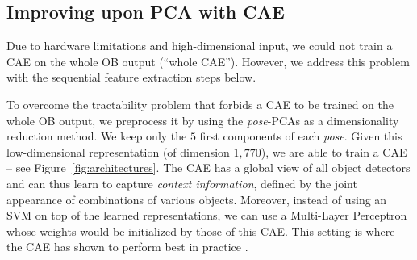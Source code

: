 \documentclass[runningheads,a4paper]{llncs}
\begin{document}
\subsection{Improving upon PCA with CAE}








Due to hardware limitations and high-dimensional input, we could not train a
CAE on the whole OB output (``whole CAE''). However, we address this problem 
with the sequential feature extraction steps below.

\label{sec:highlevel}
To overcome the tractability problem that forbids a CAE to be
trained on the whole OB output, we preprocess it by using the
\textit{pose}-PCAs as a dimensionality reduction method. We keep
only the $5$ first components of each \textit{pose}. Given this
low-dimensional representation (of dimension $1,770$), we are able to
train a CAE -- see Figure~\ref{fig:architectures}.
%
The CAE has a global view of all object detectors and
can thus learn to capture {\em context information}, defined by the
joint appearance of combinations of various objects. Moreover, instead
of using an SVM on top of the learned representations, we can use a
Multi-Layer Perceptron whose weights would be initialized by those of
this CAE. This setting is where the CAE has shown to perform
best in practice \cite{Salah+al-2011}.
\end{document}
